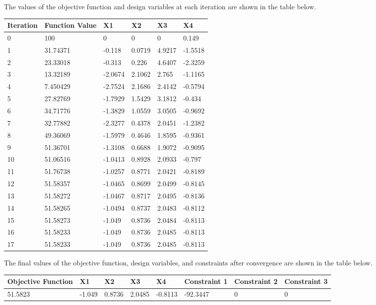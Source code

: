 \documentclass[11pt]{article}
\begin{document}
The values of the objective function and design variables at each iteration are shown in the table below.
\begin{center}
\begin{table}
    \begin{tabular}{|l|l|l|l|l|l|}
        \hline
        Iteration & Function Value & X1 & X2 & X3 & X4\\ \hline
0 & 100 & 0 & 0 & 0 & 0.149\\ 
1 & 31.74371 & -0.118 & 0.0719 & 4.9217 & -1.5518\\ 
2 & 23.33018 & -0.313 & 0.226 & 4.6407 & -2.3259\\ 
3 & 13.32189 & -2.0674 & 2.1062 & 2.765 & -1.1165\\ 
4 & 7.450429 & -2.7524 & 2.1686 & 2.4142 & -0.5794\\ 
5 & 27.82769 & -1.7929 & 1.5429 & 3.1812 & -0.434\\ 
6 & 34.71776 & -1.3829 & 1.0559 & 3.0505 & -0.9692\\ 
7 & 32.77882 & -2.3277 & 0.4378 & 2.0451 & -1.2382\\ 
8 & 49.36069 & -1.5979 & 0.4646 & 1.8595 & -0.9361\\ 
9 & 51.36701 & -1.3108 & 0.6688 & 1.9072 & -0.9095\\ 
10 & 51.06516 & -1.0413 & 0.8928 & 2.0933 & -0.797\\ 
11 & 51.76738 & -1.0257 & 0.8771 & 2.0421 & -0.8189\\ 
12 & 51.58357 & -1.0465 & 0.8699 & 2.0499 & -0.8145\\ 
13 & 51.58272 & -1.0467 & 0.8717 & 2.0495 & -0.8136\\ 
14 & 51.58265 & -1.0494 & 0.8737 & 2.0483 & -0.8112\\ 
15 & 51.58273 & -1.049 & 0.8736 & 2.0484 & -0.8113\\ 
16 & 51.58233 & -1.049 & 0.8736 & 2.0485 & -0.8113\\ 
17 & 51.58233 & -1.049 & 0.8736 & 2.0485 & -0.8113\\ 
        \hline
    \end{tabular}
\end{table}
\end{center}

The final values of the objective function, design variables, and constraints after convergence are shown in the table below.
\begin{center}
\begin{table}
    \begin{tabular}{|l|l|l|l|l|l|l|l|}
        \hline
	Objective Function & X1 & X2 & X3 & X4 & Constraint 1 & Constraint 2 & Constraint 3 \\ \hline
	51.5823 & -1.049 & 0.8736 & 2.0485 & -0.8113 & -92.3447 & 0 & 0 \\ 
	\hline
    \end{tabular}
\end{table}
\end{center}
\end{document}
